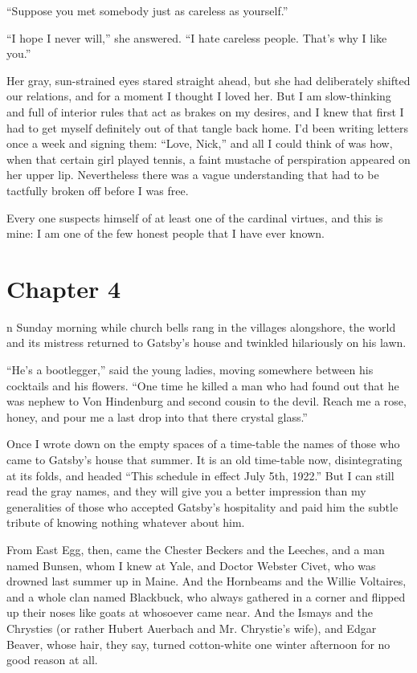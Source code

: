 \documentclass{znotebook}
\begin{document}
``Suppose you met somebody just as careless as yourself.''

``I hope I never will,'' she answered. ``I hate careless people. That's why I like you.''

Her gray, sun-strained eyes stared straight ahead, but she had deliberately shifted our relations, and for a moment I thought I loved her. But I am slow-thinking and full of interior rules that act as brakes on my desires, and I knew that first I had to get myself definitely out of that tangle back home. I'd been writing letters once a week and signing them: ``Love, Nick,'' and all I could think of was how, when that certain girl played tennis, a faint mustache of perspiration appeared on her upper lip. Nevertheless there was a vague understanding that had to be tactfully broken off before I was free.

Every one suspects himself of at least one of the cardinal virtues, and this is mine: I am one of the few honest people that I have ever known.

\chapter{Chapter 4}

\lettrine[findent=2pt]{}{ }n Sunday morning while church bells rang in the villages alongshore, the world and its mistress returned to Gatsby's house and twinkled hilariously on his lawn.

``He's a bootlegger,'' said the young ladies, moving somewhere between his cocktails and his flowers. ``One time he killed a man who had found out that he was nephew to Von Hindenburg and second cousin to the devil. Reach me a rose, honey, and pour me a last drop into that there crystal glass.''

Once I wrote down on the empty spaces of a time-table the names of those who came to Gatsby's house that summer. It is an old time-table now, disintegrating at its folds, and headed ``This schedule in effect July 5th, 1922.'' But I can still read the gray names, and they will give you a better impression than my generalities of those who accepted Gatsby's hospitality and paid him the subtle tribute of knowing nothing whatever about him.

From East Egg, then, came the Chester Beckers and the Leeches, and a man named Bunsen, whom I knew at Yale, and Doctor Webster Civet, who was drowned last summer up in Maine. And the Hornbeams and the Willie Voltaires, and a whole clan named Blackbuck, who always gathered in a corner and flipped up their noses like goats at whosoever came near. And the Ismays and the Chrysties (or rather Hubert Auerbach and Mr. Chrystie's wife), and Edgar Beaver, whose hair, they say, turned cotton-white one winter afternoon for no good reason at all.
\end{document}
